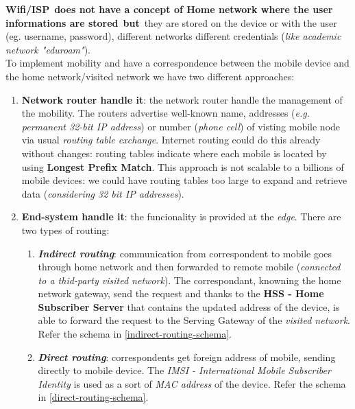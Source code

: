 \documentclass[10pt,a4paper]{report}
\theoremstyle{definition}
\begin{document}
\textbf{Wifi/ISP} \textbf{does not have a concept of Home network where the user informations are stored} \textbf{but} they are stored on the device or with the user (eg. username, password), different networks different credentials (\textit{like academic network "eduroam"}).\\
To implement mobility and have a correspondence between the mobile device and the home network/visited network we have two different approaches:
\begin{enumerate}
	\item 
	\textbf{Network router handle it}: the network router handle the management of the mobility. The routers advertise well-known name, addresses (\textit{e.g. permanent 32-bit IP address}) or number (\textit{phone cell}) of visting mobile node via usual \textit{routing table exchange}.
	Internet routing could do this already without changes: routing tables indicate where each mobile is located by using \textbf{Longest Prefix Match}.
	This approach is not scalable to a billions of mobile devices: we could have routing tables too large to expand and retrieve data (\textit{considering 32 bit IP addresses}).
	\item 
	\textbf{End-system handle it}: the funcionality is provided at the \textit{edge}. There are two types of routing:
	\begin{enumerate}
		\item 
		\textit{\textbf{Indirect routing}}: communication from correspondent to mobile goes through home network and then forwarded to remote mobile (\textit{connected to a thid-party visited network}). The correspondant, knowning the home network gateway, send the request and thanks to the \textbf{HSS - Home Subscriber Server} that contains the updated address of the device, is able to forward the request to the Serving Gateway of the \textit{visited network}. Refer the schema in \ref{indirect-routing-schema}.

		\item 
		\textit{\textbf{Direct routing}}: correspondents get foreign address of mobile, sending directly to mobile device. The \textit{IMSI - International Mobile Subscriber Identity} is used as a sort of \textit{MAC address} of the device. Refer the schema in \ref{direct-routing-schema}.

	\end{enumerate}
\end{enumerate}
\end{document}
